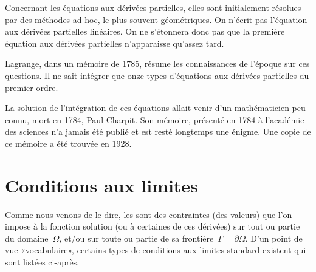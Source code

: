 \medskip
\begin{histoire}%
Concernant les équations aux dérivées partielles, elles sont initialement résolues par des méthodes ad-hoc, le plus souvent géométriques. On n'écrit pas l'équation aux dérivées partielles linéaires. On ne s'étonnera donc pas que la première équation aux dérivées partielles  n'apparaisse qu'assez tard.

\medskip
{}

\medskip
Lagrange, dans un mémoire de 1785, résume les connaissances de l'époque sur ces questions. Il ne sait intégrer que onze types d'équations aux dérivées partielles du premier ordre.

\medskip
La solution de l'intégration de ces équations allait venir d'un mathématicien peu connu, mort en 1784, Paul Charpit. Son mémoire, présenté en 1784 à l'académie des sciences n'a jamais été publié et est resté longtemps une énigme. Une copie de ce mémoire a été trouvée en 1928.
\end{histoire}

\medskip
\section{Conditions aux limites}
Comme nous venons de le dire, les  sont des contraintes (des valeurs) que l'on impose à la fonction solution (ou à certaines de ces dérivées) sur tout ou partie du domaine~$\Omega$, et/ou sur toute ou partie de sa frontière~$\Gamma=\partial\Omega$.
\parvm
D'un point de vue «vocabulaire», certains types de conditions aux limites standard existent qui sont listées ci-après.


